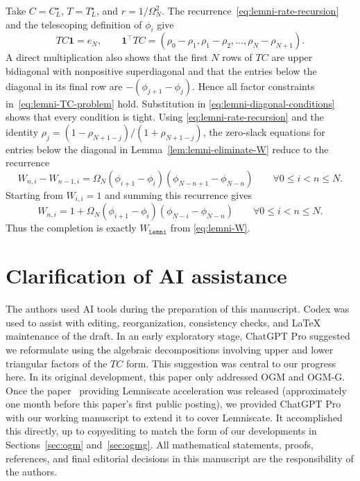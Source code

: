 \documentclass[11pt]{article}
\begin{document}
Take $C=C_L^\star$, $T=T_L^\star$, and
$r=1/\Omega_N^2$. The recurrence~\eqref{eq:lemni-rate-recursion} and the
telescoping definition of $\phi_i$ give
\[
    TC\mathbf1=e_N,
    \qquad
    \mathbf1^\top TC
    =(\rho_0-\rho_1,\rho_1-\rho_2,\dots,\rho_N-\rho_{N+1}).
\]
A direct multiplication also shows that the first $N$ rows of $TC$ are upper
bidiagonal with nonpositive superdiagonal and that the entries below the diagonal in
its final row are $-(\phi_{j+1}-\phi_j)$. Hence all factor
constraints in~\eqref{eq:lemni-TC-problem} hold. Substitution in
\eqref{eq:lemni-diagonal-conditions} shows that every condition is tight. Using \eqref{eq:lemni-rate-recursion} and the identity
$\rho_j=(1-\rho_{N+1-j})/(1+\rho_{N+1-j})$, the zero-slack equations for
entries below the diagonal in Lemma~\ref{lem:lemni-eliminate-W}
reduce to the recurrence
\[
    W_{n,i}-W_{n-1,i}
    =\Omega_N(\phi_{i+1}-\phi_i)
      (\phi_{N-n+1}-\phi_{N-n})
    \qquad \forall 0\leq i<n\leq N.
\]
Starting from $W_{i,i}=1$ and summing this recurrence gives
\[
    W_{n,i}
    =1+\Omega_N(\phi_{i+1}-\phi_i)
      (\phi_{N-i}-\phi_{N-n})
    \qquad \forall 0\leq i<n\leq N.
\]
Thus the completion is exactly $W_\mathtt{Lemni}$ from
\eqref{eq:lemni-W}.


\section{Clarification of AI assistance}

The authors used AI tools during the preparation of this manuscript. Codex was used to assist with editing, reorganization, consistency checks, and \LaTeX{} maintenance of the draft. In an early exploratory stage, ChatGPT Pro suggested we reformulate using the algebraic decompositions involving upper and lower triangular factors of the $TC$ form. This suggestion was central to our progress here. In its original development, this paper only addressed OGM and OGM-G. Once the paper~\cite{KimRyuDasGupta26} providing Lemniscate acceleration was released (approximately one month before this paper's first public posting), we provided ChatGPT Pro with our working manuscript to extend it to cover Lemniscate. It accomplished this directly, up to copyediting to match the form of our developments in Sections~\ref{sec:ogm} and~\ref{sec:ogmg}.
All mathematical statements, proofs, references, and final editorial decisions in this manuscript are the responsibility of the authors.
\end{document}
